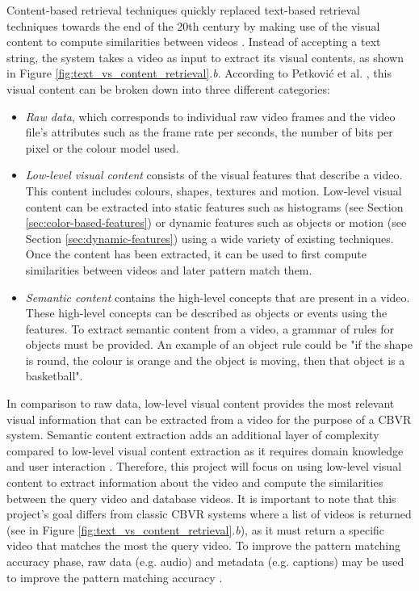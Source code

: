 Content-based retrieval techniques quickly replaced text-based retrieval techniques towards the end of the 20th century by making use of the visual content to compute similarities between videos \cite{lai2015trajectory}. Instead of accepting a text string, the system takes a video as input to extract its visual contents, as shown in Figure \ref{fig:text_vs_content_retrieval}.\emph{b}. According to Petković et al. \cite{petkovic2000}, this visual content can be broken down into three different categories:
\begin{itemize}
    \item \textit{Raw data}, which corresponds to individual raw video frames and the video file's attributes such as the frame rate per seconds, the number of bits per pixel or the colour model used.
    \item \textit{Low-level visual content}  consists of the visual features that describe a video. This content includes colours, shapes, textures and motion. Low-level visual content can be extracted into static features such as histograms (see Section \ref{sec:color-based-features}) or dynamic features such as objects or motion (see Section \ref{sec:dynamic-features}) using a wide variety of existing techniques. Once the content has been extracted, it can be used to first compute similarities between videos \cite{lai2015trajectory} and later pattern match them.
    \item \textit{Semantic content} contains the high-level concepts that are present in a video. These high-level concepts can be described as objects or events using the features. To extract semantic content from a video, a grammar of rules for objects must be provided. An example of an object rule could be "if the shape is round, the colour is orange and the object is moving, then that object is a basketball".
\end{itemize}

In comparison to raw data, low-level visual content provides the most relevant visual information that can be extracted from a video for the purpose of a CBVR system. Semantic content extraction adds an additional layer of complexity compared to low-level visual content extraction as it requires domain knowledge and user interaction \cite{petkovic2000}. Therefore, this project will focus on using low-level visual content to extract information about the video and compute the similarities between the query video and database videos. It is important to note that this project's goal differs from classic CBVR systems where a list of videos is returned (see in Figure \ref{fig:text_vs_content_retrieval}.\emph{b}), as it must return a specific video that matches the most the query video. To improve the pattern matching accuracy phase, raw data (e.g. audio) and metadata (e.g. captions) may be used to improve the pattern matching accuracy \cite{patel2012}.\\

